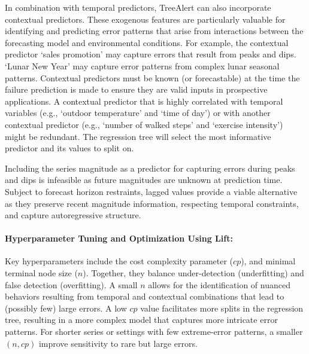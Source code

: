 \documentclass[]{interact}
\theoremstyle{definition}
\begin{document}
In combination with temporal predictors, TreeAlert can also incorporate contextual predictors. These exogenous features are particularly valuable for identifying and predicting error patterns that arise from interactions between the forecasting model and environmental conditions. For example, the contextual predictor ‘sales promotion’ may capture errors that result from peaks and dips. `Lunar New Year' may capture error patterns from complex lunar seasonal patterns. Contextual predictors must be known (or forecastable) at the time the failure prediction is made to ensure they are valid inputs in prospective applications. A contextual predictor that is highly correlated with temporal variables (e.g., `outdoor temperature' and `time of day') or with another contextual predictor (e.g., `number of walked steps' and `exercise intensity') might be redundant. The regression tree will select the most informative predictor and its values to split on.

Including the series magnitude as a predictor for capturing errors during peaks and dips is infeasible as future magnitudes are unknown at prediction time. Subject to forecast horizon restraints, lagged values provide a viable alternative as they preserve recent magnitude information, respecting temporal constraints, and capture autoregressive structure.


\paragraph*{Hyperparameter Tuning and Optimization Using Lift:}
\label{sec:tuning_optimization}

Key hyperparameters include the cost complexity parameter ($cp$), and minimal terminal node size ($n$). Together, they balance under-detection (underfitting) and false detection (overfitting). A small $n$ allows for the identification of nuanced behaviors resulting from temporal and contextual combinations that lead to (possibly few) large errors. A low $cp$ value facilitates more splits in the regression tree, resulting in a more complex model that captures more intricate error patterns. For shorter series or settings with few extreme-error patterns, a smaller $(n, cp)$ improve sensitivity to rare but large errors.
\end{document}
